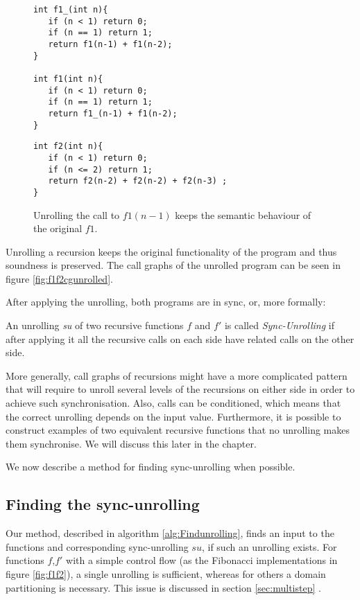 \begin{figure}[h]
\begin{center}
\begin{minipage}{7 cm}
\begin{lstlisting}
int f1_(int n){
   if (n < 1) return 0;
   if (n == 1) return 1; 
   return f1(n-1) + f1(n-2);
}

int f1(int n){
   if (n < 1) return 0;
   if (n == 1) return 1; 
   return f1_(n-1) + f1(n-2);
}
\end{lstlisting}
\end{minipage}
\begin{minipage}{7 cm}
\begin{lstlisting}
int f2(int n){
   if (n < 1) return 0;
   if (n <= 2) return 1;
   return f2(n-2) + f2(n-2) + f2(n-3) ;
}
\end{lstlisting}
\end{minipage}
\caption{Unrolling the call to $f1(n-1)$ keeps the semantic behaviour of the original $f1$.}
\label{fig:f1f2unrolled}
\end{center}
\end{figure}
 Unrolling a recursion keeps the original functionality of the program and thus soundness is preserved. The call graphs of the unrolled program can be seen in figure \ref{fig:f1f2cgunrolled}. 

After applying the unrolling, both programs are in sync, or, more formally: 
\begin{definition}
An unrolling \emph{su} of two recursive functions $f$ and $f'$ is called \emph{Sync-Unrolling} if after applying it all the recursive calls on each side have related calls on the other side.
\end{definition}

More generally, call graphs of recursions might have a more complicated pattern that will require to unroll several levels of the recursions on either side in order to achieve such synchronisation. Also, calls can be conditioned, which means that the correct unrolling depends on the input value. Furthermore, it is possible to construct examples of two equivalent recursive functions that no unrolling makes them synchronise. We will discuss this later in the chapter. 

We now describe a method for finding sync-unrolling when possible.

\subsection{Finding the sync-unrolling}
Our method, described in algorithm \ref{alg:Findunrolling}, finds an input to the functions and corresponding sync-unrolling $su$, if such an unrolling exists. 
For functions $f$,$f'$ with a simple control flow (as the Fibonacci implementations in figure \ref{fig:f1f2}), a single unrolling is sufficient, whereas for others a domain partitioning is necessary. This issue is discussed in section \ref{sec:multistep} . 

